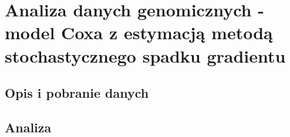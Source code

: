 \chapter{Analiza danych genomicznych - model Coxa z estymacją metodą stochastycznego spadku gradientu}
\section{Opis i pobranie danych}
\section{Analiza}